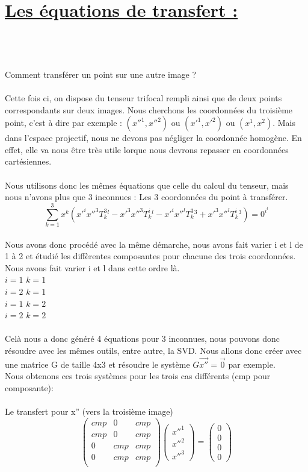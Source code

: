 \documentclass[a4paper,11pt,fleqn]{report}
\begin{document}
\section{\underline{Les \'equations de transfert :}}
\\\\\\
	Comment transf\'erer un point sur une autre image ?\\\\
	Cette fois ci, on dispose du tenseur trifocal rempli ainsi que de deux points correspondants sur deux images.
	Nous cherchons les coordonn\'ees du troisi\`eme point, c'est \`a dire par exemple : $(x''^1,x''^2)$ ou $(x'^1,x'^2)$ ou $(x^1,x^2)$. Mais dans  l'espace projectif, nous ne devons pas n\'egliger la coordonn\'ee homog\`ene. En effet, elle va nous \^etre tr\`es utile lorque nous devrons repasser en coordonn\'ees cart\'esiennes.
	\\
	\\
	Nous utilisons donc les m\^emes \'equations que celle du calcul du tenseur, mais nous n'avons plus que 3 inconnues : Les 3 coordonn\'ees du point \`a transf\'erer.
	$$\sum \limits_{k=1}^3 x^k(x'^ix''^3T_k^3^l - x'^3x''^3T_k^i^l - x'^ix''^lT_k^3^3 + x'^3x''^lT_k^i^3) = 0^i^l$$
	\\
	Nous avons donc proc\'ed\'e avec la m\^eme d\'emarche, nous avons fait varier i et l de 1 \`a 2 et \'etudi\'e les diff\`erentes composantes pour chacune des trois coordonn\'ees. Nous avons fait varier i et l dans cette ordre l\`a.
	\\$i=1$ $k=1$
	\\$i=2$ $k=1$
	\\$i=1$ $k=2$
	\\$i=2$ $k=2$\\\\Cel\`a nous a donc g\'en\'er\'e 4 \'equations pour 3 inconnues, nous pouvons donc r\'esoudre avec les m\^emes outils, entre autre, la SVD. Nous allons donc cr\'eer avec une matrice G de taille 4x3 et r\'esoudre le syst\`eme $G\vec{x''} = \vec{0}$ par exemple.\\Nous obtenons ces trois syst\`emes pour les trois cas diff\'erents (cmp pour composante):\\\\
	Le transfert pour x'' (vers la troisi\`eme image)\\
	$$ \begin{pmatrix}
	cmp&0&cmp \\
	cmp&0&cmp \\
	0&cmp&cmp \\
	0&cmp&cmp \\
	\end{pmatrix}\begin{pmatrix}x''^1\\x''^2\\x''^3\end{pmatrix} = \begin{pmatrix}0\\0\\0\\0\end{pmatrix} $$
\end{document}

